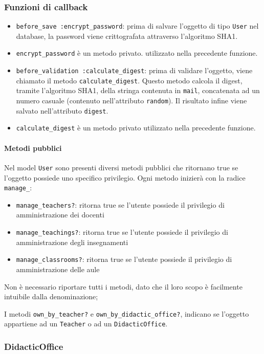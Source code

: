 \documentclass[11pt,a4paper]{article}
\begin{document}
\subsubsection*{Funzioni di callback}
\begin{itemize}
 \item \verb|before_save :encrypt_password|: prima di salvare l'oggetto di tipo \verb|User| nel database, la password viene crittografata attraverso l'algoritmo SHA1. 
\item \verb|encrypt_password| è un metodo privato. utilizzato nella precedente funzione.
\item \verb|before_validation :calculate_digest|: prima di validare l'oggetto, viene chiamato il metodo \verb|calculate_digest|. Questo metodo calcola il digest, tramite l'algoritmo SHA1, della stringa contenuta in \verb|mail|, concatenata ad un numero casuale (contenuto nell'attributo \verb|random|). Il risultato infine viene salvato nell'attributo \verb|digest|. 
\item \verb|calculate_digest| è un metodo privato utilizzato nella precedente funzione.
\end{itemize}
\paragraph{Metodi pubblici}
Nel model \verb|User| sono presenti diversi metodi pubblici che ritornano true se l'oggetto possiede uno specifico privilegio. Ogni metodo inizierà con la radice \verb|manage_|:
\begin{itemize}
 \item \verb|manage_teachers?|: ritorna true se l'utente possiede il privilegio di amministrazione dei docenti
 \item \verb|manage_teachings?|: ritorna true se l'utente possiede il privilegio di amministrazione degli insegnamenti
 \item \verb|manage_classrooms?|: ritorna true se l'utente possiede il privilegio di amministrazione delle aule
 \end{itemize}
Non è necessario riportare tutti i metodi, dato che il loro scopo è facilmente intuibile dalla denominazione;

I metodi \verb|own_by_teacher?| e \verb|own_by_didactic_office?|, indicano se l'oggetto appartiene ad un \verb|Teacher| o ad un \verb|DidacticOffice|.
\subsubsection{DidacticOffice}
\end{document}
